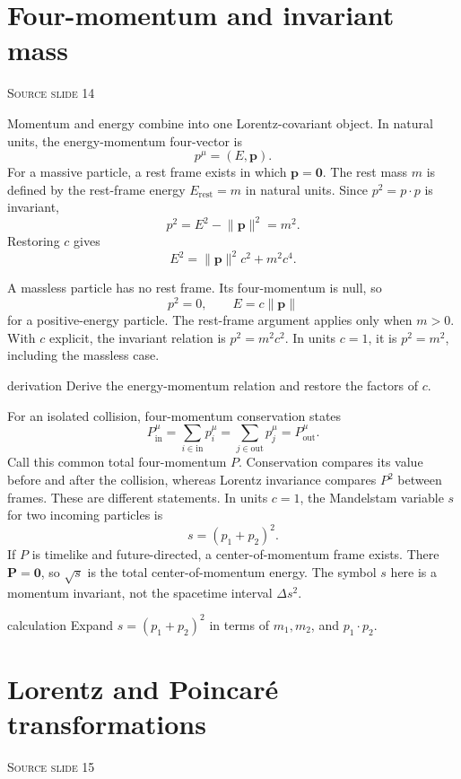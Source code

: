 \documentclass[11pt,a4paper]{article}
\newcommand{\vect}[1]{\bm{#1}}
\newcommand{\slideref}[1]{%
  \par\smallskip
  {\footnotesize\color{ink!60}\textsc{Source slide #1}}\par
}
\begin{document}
\section{Four-momentum and invariant mass}
\slideref{14}

Momentum and energy combine into one Lorentz-covariant object. In natural
units, the energy-momentum four-vector is
\[
  p^\mu=(E,\vect{p}).
\]
For a massive particle, a rest frame exists in which
\(\vect p=\vect{0}\). The rest mass \(m\) is defined by the rest-frame energy
\(E_{\mathrm{rest}}=m\) in natural units. Since \(p^2=p\cdot p\) is invariant,
\[
\boxed{p^2=E^2-\lVert\vect{p}\rVert^2=m^2.}
\]
Restoring \(c\) gives
\[
\boxed{E^2=\lVert\vect{p}\rVert^2c^2+m^2c^4.}
\]

\begin{precision}
A massless particle has no rest frame. Its four-momentum is null, so
\[
  p^2=0,\qquad E=c\lVert\vect{p}\rVert
\]
for a positive-energy particle. The rest-frame argument applies only when
\(m>0\). With \(c\) explicit, the invariant relation is \(p^2=m^2c^2\).
In units \(c=1\), it is \(p^2=m^2\), including the massless case.
\end{precision}

\begin{studentwork}[height=6.5cm]{derivation}
Derive the energy-momentum relation and restore the factors of \(c\).
\end{studentwork}

For an isolated collision, four-momentum conservation states
\[
  P^\mu_{\mathrm{in}}=\sum_{i\in\mathrm{in}}p_i^\mu
  =\sum_{j\in\mathrm{out}}p_j^\mu=P^\mu_{\mathrm{out}}.
\]
Call this common total four-momentum \(P\). Conservation compares its value
before and after the collision, whereas Lorentz invariance compares \(P^2\)
between frames. These are different statements. In units \(c=1\), the
Mandelstam variable \(s\) for two incoming particles is
\[
  s=(p_1+p_2)^2.
\]
If \(P\) is timelike and future-directed, a center-of-momentum frame exists.
There \(\vect P=\vect0\), so \(\sqrt{s}\) is the total center-of-momentum
energy. The symbol \(s\) here is a momentum invariant, not the spacetime
interval \(\Delta s^2\).

\begin{studentwork}[height=5.8cm]{calculation}
Expand \(s=(p_1+p_2)^2\) in terms of \(m_1,m_2\), and \(p_1\cdot p_2\).
\end{studentwork}

\section{Lorentz and Poincar\'e transformations}
\label{sec:lorentz-poincare}
\slideref{15}
\end{document}
